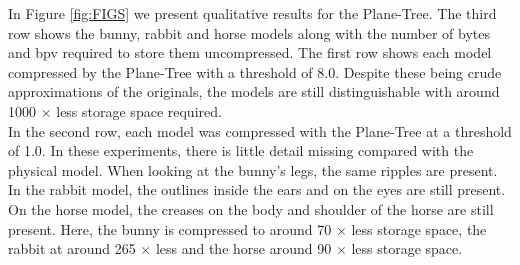 In Figure \ref{fig:FIGS} we present qualitative results for the Plane-Tree. The third row shows the bunny, rabbit and horse models along with the number of bytes and bpv required to store them uncompressed. The first row shows each model compressed by the Plane-Tree with a threshold of 8.0. Despite these being crude approximations of the originals, the models are still distinguishable with around 1000 $\times$ less storage space required. \\

In the second row, each model was compressed with the Plane-Tree at a threshold of 1.0. In these experiments, there is little detail missing compared with the physical model. When looking at the bunny's legs, the same ripples are present. In the rabbit model, the outlines inside the ears and on the eyes are still present. On the horse model, the creases on the body and shoulder of the horse are still present. Here, the bunny is compressed to around 70 $\times$ less storage space, the rabbit at around 265 $\times$ less and the horse around 90 $\times$ less storage space. \\


